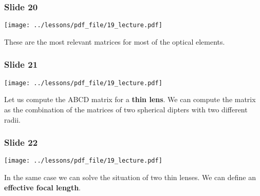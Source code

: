 \documentclass[../main/main.tex]{subfiles}
\begin{document}
\subsubsection*{Slide 20}

\begin{minipage}[]{0.5\linewidth}
\centering
\texttt{[image: ../lessons/pdf\_file/19\_lecture.pdf]}
\end{minipage}
\hspace{0.3cm}\vspace{0.3cm}
\begin{minipage}[c]{0.47\linewidth}

These are the most relevant matrices for most of the optical elements.

\end{minipage}

\subsubsection*{Slide 21}

\begin{minipage}[]{0.5\linewidth}
\centering
\texttt{[image: ../lessons/pdf\_file/19\_lecture.pdf]}
\end{minipage}
\hspace{0.3cm}\vspace{0.3cm}
\begin{minipage}[c]{0.47\linewidth}

Let us compute the ABCD matrix for a \textbf{thin lens}. We can compute the matrix as the combination of the matrices of two spherical dipters with two different radii.

\end{minipage}

\subsubsection*{Slide 22}

\begin{minipage}[]{0.5\linewidth}
\centering
\texttt{[image: ../lessons/pdf\_file/19\_lecture.pdf]}
\end{minipage}
\hspace{0.3cm}\vspace{0.3cm}
\begin{minipage}[c]{0.47\linewidth}

In the same case we can solve the situation of two thin lenses.
We can define an \textbf{effective focal length}.


\end{minipage}
\end{document}
